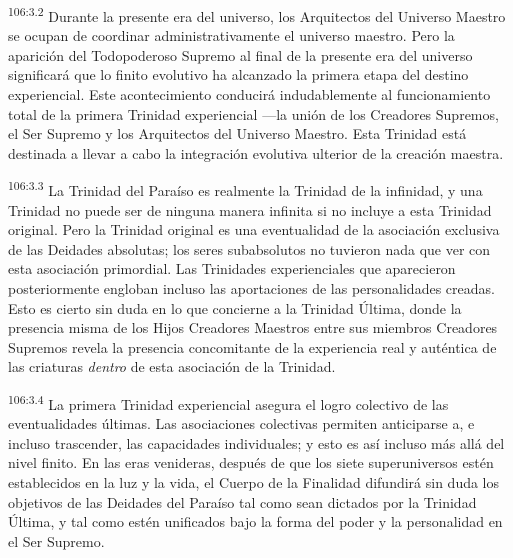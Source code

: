\par
\textsuperscript{106:3.2} Durante la presente era del universo, los Arquitectos del Universo Maestro se ocupan de coordinar administrativamente el universo maestro. Pero la aparición del Todopoderoso Supremo al final de la presente era del universo significará que lo finito evolutivo ha alcanzado la primera etapa del destino experiencial. Este acontecimiento conducirá indudablemente al funcionamiento total de la primera Trinidad experiencial ---la unión de los Creadores Supremos, el Ser Supremo y los Arquitectos del Universo Maestro. Esta Trinidad está destinada a llevar a cabo la integración evolutiva ulterior de la creación maestra.

\par
\textsuperscript{106:3.3} La Trinidad del Paraíso es realmente la Trinidad de la infinidad, y una Trinidad no puede ser de ninguna manera infinita si no incluye a esta Trinidad original. Pero la Trinidad original es una eventualidad de la asociación exclusiva de las Deidades absolutas; los seres subabsolutos no tuvieron nada que ver con esta asociación primordial. Las Trinidades experienciales que aparecieron posteriormente engloban incluso las aportaciones de las personalidades creadas. Esto es cierto sin duda en lo que concierne a la Trinidad Última, donde la presencia misma de los Hijos Creadores Maestros entre sus miembros Creadores Supremos revela la presencia concomitante de la experiencia real y auténtica de las criaturas \textit{dentro} de esta asociación de la Trinidad.

\par
\textsuperscript{106:3.4} La primera Trinidad experiencial asegura el logro colectivo de las eventualidades últimas. Las asociaciones colectivas permiten anticiparse a, e incluso trascender, las capacidades individuales; y esto es así incluso más allá del nivel finito. En las eras venideras, después de que los siete superuniversos estén establecidos en la luz y la vida, el Cuerpo de la Finalidad difundirá sin duda los objetivos de las Deidades del Paraíso tal como sean dictados por la Trinidad Última, y tal como estén unificados bajo la forma del poder y la personalidad en el Ser Supremo.

